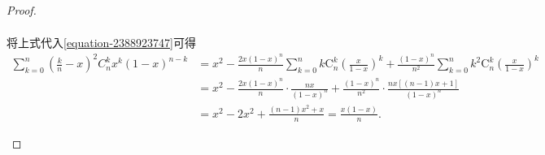 \documentclass[../../main.tex]{subfiles}%
\begin{document}
\begin{proof}
\begin{enumerate}
\begin{gather*}
\end{gather*}
将上式代入\eqref{equation-2388923747}可得
\begin{align*}
\sum_{k=0}^n{\left( \frac{k}{n}-x \right) ^2C_{n}^{k}x^k\left( 1-x \right) ^{n-k}}&=x^2-\frac{2x\left( 1-x \right) ^n}{n}\sum_{k=0}^n{k\mathrm{C}_{n}^{k}\left( \frac{x}{1-x} \right) ^k}+\frac{\left( 1-x \right) ^n}{n^2}\sum_{k=0}^n{k^2\mathrm{C}_{n}^{k}\left( \frac{x}{1-x} \right) ^k}
\\
&=x^2-\frac{2x\left( 1-x \right) ^n}{n}\cdot \frac{nx}{\left( 1-x \right) ^n}+\frac{\left( 1-x \right) ^n}{n^2}\cdot \frac{nx\left[ \left( n-1 \right) x+1 \right]}{\left( 1-x \right) ^n}
\\
&=x^2-2x^2+\frac{\left( n-1 \right) x^2+x}{n}=\frac{x\left( 1-x \right)}{n}.
\end{align*}
\end{enumerate}
\end{proof}
\end{document}
